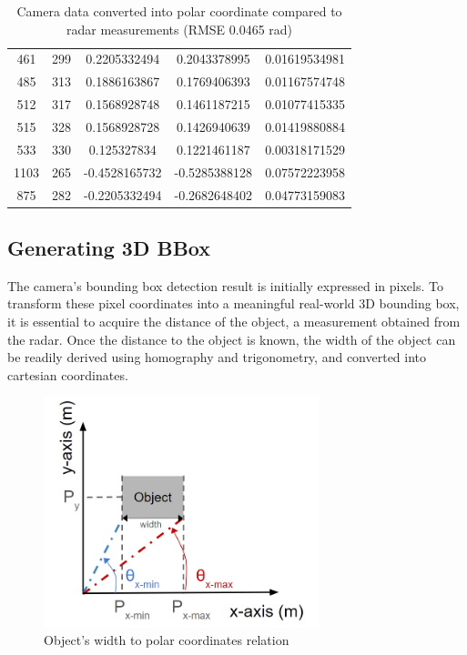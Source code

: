 \begin{table}[htbp]
\begin{tabular}{|c|c|c|c|c|}
        461 & 299 & 0.2205332494 & 0.2043378995 & 0.01619534981 \\
        485 & 313 & 0.1886163867 & 0.1769406393 & 0.01167574748 \\
        512 & 317 & 0.1568928748 & 0.1461187215 & 0.01077415335 \\
        515 & 328 & 0.1568928728 & 0.1426940639 & 0.01419880884 \\
        533 & 330 & 0.125327834 & 0.1221461187 & 0.00318171529 \\
        1103 & 265 & -0.4528165732 & -0.5285388128 & 0.07572223958 \\
        875 & 282 & -0.2205332494 & -0.2682648402 & 0.04773159083 \\
        \hline
    \end{tabular}
    \caption{Camera data converted into polar coordinate compared to radar measurements (RMSE 0.0465 rad)}
    \label{tab:cam_radar_data}
    \end{table}
\newpage
\subsection{Generating 3D BBox}\label{subsec:2-4-generating-bbox}
The camera's bounding box detection result is initially expressed in pixels. 
To transform these pixel coordinates into a meaningful real-world 3D bounding box, 
it is essential to acquire the distance of the object, a measurement obtained from the radar. 
Once the distance to the object is known, 
the width of the object can be readily derived using homography and trigonometry, 
and converted into cartesian coordinates.
\begin{figure}[hpbt]
    \centering
    \includegraphics[width=8cm]{Figures/cart_width.png}%
    \caption{Object's width to polar coordinates relation}
    \label{fig:cart_width}
\end{figure}

